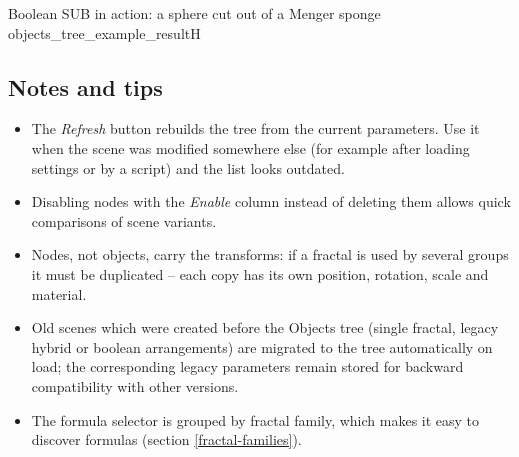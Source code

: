 {Boolean SUB in action: a sphere cut out of a Menger sponge}
{objects_tree_example_result}{H}

\subsection{Notes and tips}\label{objects-tree-tips}

\begin{itemize}
	\item The \emph{Refresh} button rebuilds the tree from the current parameters. Use it when the
	scene was modified somewhere else (for example after loading settings or by a script) and the
	list looks outdated.
	\item Disabling nodes with the \emph{Enable} column instead of deleting them allows quick
	comparisons of scene variants.
	\item Nodes, not objects, carry the transforms: if a fractal is used by several groups it must
	be duplicated -- each copy has its own position, rotation, scale and material.
	\item Old scenes which were created before the Objects tree (single fractal, legacy hybrid or
	boolean arrangements) are migrated to the tree automatically on load; the corresponding legacy
	parameters remain stored for backward compatibility with other versions.
	\item The formula selector is grouped by fractal family, which makes it easy to discover
	formulas (section \ref{fractal-families}).
\end{itemize}
